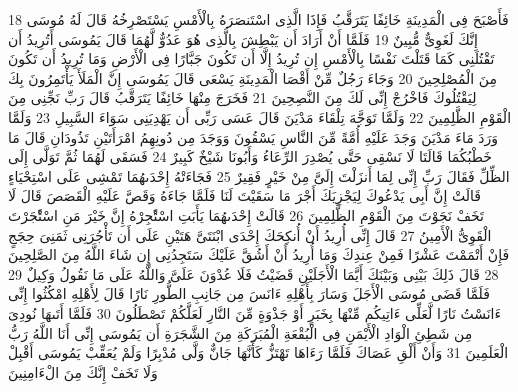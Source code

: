\documentclass[20pt,a4paper]{article}
\begin{document}
{\tiny\colorbox{cl_aya}{18}} فَأَصْبَحَ فِى الْمَدِينَةِ خَائِفًا يَتَرَقَّبُ فَإِذَا الَّذِى اسْتَنصَرَهُ بِالْأَمْسِ يَسْتَصْرِخُهُ قَالَ لَهُ مُوسَى إِنَّكَ لَغَوِىٌّ مُّبِينٌ
{\tiny\colorbox{cl_aya}{19}} فَلَمَّا أَنْ أَرَادَ أَن يَبْطِشَ بِالَّذِى هُوَ عَدُوٌّ لَّهُمَا قَالَ يَمُوسَى أَتُرِيدُ أَن تَقْتُلَنِى كَمَا قَتَلْتَ نَفْسًا بِالْأَمْسِ إِن تُرِيدُ إِلَّا أَن تَكُونَ جَبَّارًا فِى الْأَرْضِ وَمَا تُرِيدُ أَن تَكُونَ مِنَ الْمُصْلِحِينَ
{\tiny\colorbox{cl_aya}{20}} وَجَاءَ رَجُلٌ مِّنْ أَقْصَا الْمَدِينَةِ يَسْعَى قَالَ يَمُوسَى إِنَّ الْمَلَأَ يَأْتَمِرُونَ بِكَ لِيَقْتُلُوكَ فَاخْرُجْ إِنِّى لَكَ مِنَ النَّصِحِينَ
{\tiny\colorbox{cl_aya}{21}} فَخَرَجَ مِنْهَا خَائِفًا يَتَرَقَّبُ قَالَ رَبِّ نَجِّنِى مِنَ الْقَوْمِ الظَّلِمِينَ
{\tiny\colorbox{cl_aya}{22}} وَلَمَّا تَوَجَّهَ تِلْقَاءَ مَدْيَنَ قَالَ عَسَى رَبِّى أَن يَهْدِيَنِى سَوَاءَ السَّبِيلِ
{\tiny\colorbox{cl_aya}{23}} وَلَمَّا وَرَدَ مَاءَ مَدْيَنَ وَجَدَ عَلَيْهِ أُمَّةً مِّنَ النَّاسِ يَسْقُونَ وَوَجَدَ مِن دُونِهِمُ امْرَأَتَيْنِ تَذُودَانِ قَالَ مَا خَطْبُكُمَا قَالَتَا لَا نَسْقِى حَتَّى يُصْدِرَ الرِّعَاءُ وَأَبُونَا شَيْخٌ كَبِيرٌ
{\tiny\colorbox{cl_aya}{24}} فَسَقَى لَهُمَا ثُمَّ تَوَلَّى إِلَى الظِّلِّ فَقَالَ رَبِّ إِنِّى لِمَا أَنزَلْتَ إِلَىَّ مِنْ خَيْرٍ فَقِيرٌ
{\tiny\colorbox{cl_aya}{25}} فَجَاءَتْهُ إِحْدَىهُمَا تَمْشِى عَلَى اسْتِحْيَاءٍ قَالَتْ إِنَّ أَبِى يَدْعُوكَ لِيَجْزِيَكَ أَجْرَ مَا سَقَيْتَ لَنَا فَلَمَّا جَاءَهُ وَقَصَّ عَلَيْهِ الْقَصَصَ قَالَ لَا تَخَفْ نَجَوْتَ مِنَ الْقَوْمِ الظَّلِمِينَ
{\tiny\colorbox{cl_aya}{26}} قَالَتْ إِحْدَىهُمَا يَأَبَتِ اسْتَْٔجِرْهُ إِنَّ خَيْرَ مَنِ اسْتَْٔجَرْتَ الْقَوِىُّ الْأَمِينُ
{\tiny\colorbox{cl_aya}{27}} قَالَ إِنِّى أُرِيدُ أَنْ أُنكِحَكَ إِحْدَى ابْنَتَىَّ هَتَيْنِ عَلَى أَن تَأْجُرَنِى ثَمَنِىَ حِجَجٍ فَإِنْ أَتْمَمْتَ عَشْرًا فَمِنْ عِندِكَ وَمَا أُرِيدُ أَنْ أَشُقَّ عَلَيْكَ سَتَجِدُنِى إِن شَاءَ اللَّهُ مِنَ الصَّلِحِينَ
{\tiny\colorbox{cl_aya}{28}} قَالَ ذَلِكَ بَيْنِى وَبَيْنَكَ أَيَّمَا الْأَجَلَيْنِ قَضَيْتُ فَلَا عُدْوَنَ عَلَىَّ وَاللَّهُ عَلَى مَا نَقُولُ وَكِيلٌ
{\tiny\colorbox{cl_aya}{29}} فَلَمَّا قَضَى مُوسَى الْأَجَلَ وَسَارَ بِأَهْلِهِ ءَانَسَ مِن جَانِبِ الطُّورِ نَارًا قَالَ لِأَهْلِهِ امْكُثُوا إِنِّى ءَانَسْتُ نَارًا لَّعَلِّى ءَاتِيكُم مِّنْهَا بِخَبَرٍ أَوْ جَذْوَةٍ مِّنَ النَّارِ لَعَلَّكُمْ تَصْطَلُونَ
{\tiny\colorbox{cl_aya}{30}} فَلَمَّا أَتَىهَا نُودِىَ مِن شَطِئِ الْوَادِ الْأَيْمَنِ فِى الْبُقْعَةِ الْمُبَرَكَةِ مِنَ الشَّجَرَةِ أَن يَمُوسَى إِنِّى أَنَا اللَّهُ رَبُّ الْعَلَمِينَ
{\tiny\colorbox{cl_aya}{31}} وَأَنْ أَلْقِ عَصَاكَ فَلَمَّا رَءَاهَا تَهْتَزُّ كَأَنَّهَا جَانٌّ وَلَّى مُدْبِرًا وَلَمْ يُعَقِّبْ يَمُوسَى أَقْبِلْ وَلَا تَخَفْ إِنَّكَ مِنَ الْءَامِنِينَ
\end{document}
